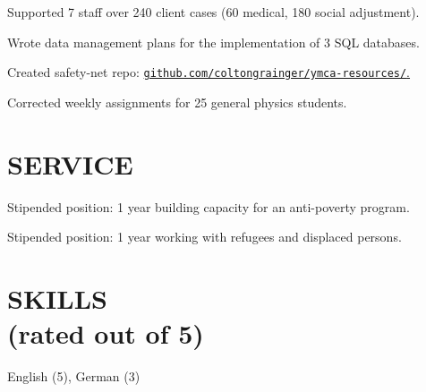 \documentclass[margin]{res}
\begin{document}
\begin{resume}
    \begin{details}
        \item{Supported 7 staff over 240 client cases (60 medical, 180 social adjustment).}
        \item{Wrote data management plans for the implementation of 3 SQL databases.}
        \item{Created safety-net repo: \href{https://github.com/coltongrainger/ymca-resources/}{\texttt{github.com/coltongrainger/ymca-resources/}.}}
    \end{details}

    \begin{details}
        \item{Corrected weekly assignments for 25 general physics students.}
     \end{details} 

\section{SERVICE}

    \begin{details}
        \item{Stipended position: 1 year building capacity for an anti-poverty program.}
    \end{details}

    \begin{details}
        \item{Stipended position: 1 year working with refugees and displaced persons.}
    \end{details}

\section{SKILLS\\ (rated out of 5)} \vspace{0pt}
\begin{multicols}{2} \parskip=0pt

    \begin{details}
    \item English (5), German (3)
    \end{details}


\end{multicols}
\end{resume}
\end{document}
